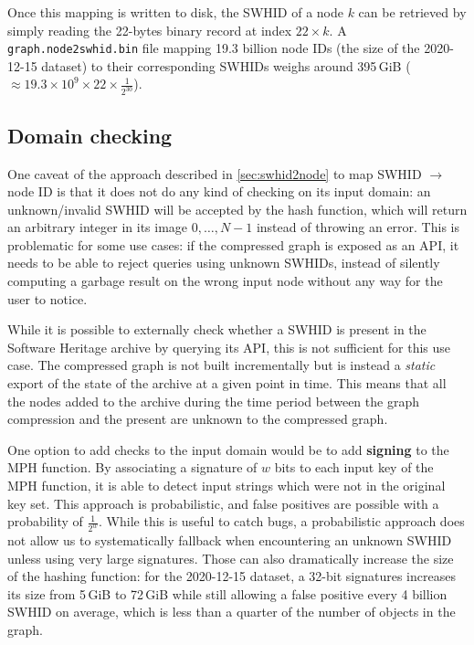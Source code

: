 Once this mapping is written to disk, the \gls{SWHID} of a node $k$ can be
retrieved by simply reading the 22-bytes binary record at index $22 \times k$.
A \texttt{graph.node2swhid.bin} file mapping 19.3 billion node IDs (the size of
the 2020-12-15 dataset) to their corresponding \glspl{SWHID} weighs
around 395\,GiB ($\approx 19.3 \times 10^9 \times 22 \times \frac{1}{2^{30}}$).

\subsection{Domain checking}

One caveat of the approach described in \cref{sec:swhid2node} to map
\gls{SWHID} $\to$ node ID is that it does not do any kind of checking on its
input domain: an unknown/invalid \gls{SWHID} will be accepted by the hash
function, which will return an arbitrary integer in its image ${0,\ldots,N-1}$
instead of throwing an error. This is problematic for some use cases: if the
compressed graph is exposed as an API, it needs to be able to reject queries
using unknown \glspl{SWHID}, instead of silently computing a garbage result on
the wrong input node without any way for the user to notice.

While it is possible to externally check whether a \gls{SWHID} is present in
the Software Heritage archive by querying its API, this is not sufficient for
this use case. The compressed graph is not built incrementally but is instead a
\emph{static} export of the state of the archive at a given point in time. This
means that all the nodes added to the archive during the time period between
the graph compression and the present are unknown to the compressed graph.

One option to add checks to the input domain would be to add \textbf{signing} to
the \gls{MPH} function. By associating a signature of $w$ bits to each input
key of the \gls{MPH} function, it is able to detect input strings which were
not in the original key set. This approach is probabilistic, and false
positives are possible with a probability of {\Large $\frac{1}{2^w}$}. While
this is useful to catch bugs, a probabilistic approach does not allow us to
systematically fallback when encountering an unknown \gls{SWHID} unless using
very large signatures. Those can also dramatically increase the size of the
hashing function: for the 2020-12-15 dataset, a 32-bit signatures increases its
size from 5\,GiB to 72\,GiB while still allowing a false positive every 4
billion \gls{SWHID} on average, which is less than a quarter of the number of
objects in the graph.

